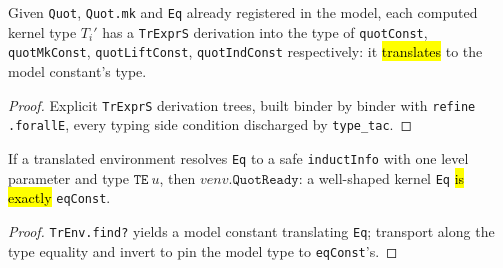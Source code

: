 \begin{lemma}
\label{family:quot-type-tr}
\leanok
{}

 Given \texttt{Quot}, \texttt{Quot.mk} and \texttt{Eq} already registered in
the model, each computed kernel type $T_i'$ has a \texttt{TrExprS} derivation into the
type of \texttt{quotConst}, \texttt{quotMkConst}, \texttt{quotLiftConst},
\texttt{quotIndConst} respectively: it \hl{translates} to the model constant's type.
\end{lemma}
\begin{proof}
\leanok
{} Explicit \texttt{TrExprS} derivation trees, built binder by binder with
\texttt{refine .forallE}, every typing side condition discharged by \texttt{type\_tac}.
\end{proof}

\begin{theorem}
\label{thm:quot-ready}
\leanok
{}

 If a translated environment resolves \texttt{Eq} to a safe
\texttt{inductInfo} with one level parameter and type $\mathtt{TE}\ u$, then
$venv.\mathtt{QuotReady}$: a well-shaped kernel \texttt{Eq} \hl{is exactly}
\texttt{eqConst}.
\end{theorem}
\begin{proof}
\leanok
{} \texttt{TrEnv.find?} yields a model constant translating \texttt{Eq};
transport along the type equality and invert to pin the model type to
\texttt{eqConst}'s.
\end{proof}


